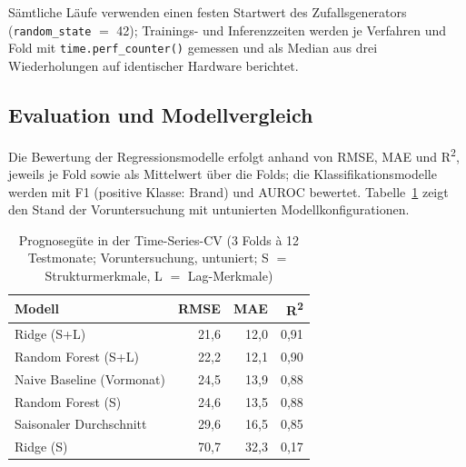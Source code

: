 Sämtliche Läufe verwenden einen festen Startwert des Zufallsgenerators
(\texttt{random\_state} $=$ 42); Trainings- und Inferenzzeiten werden je
Verfahren und Fold mit \texttt{time.perf\_counter()} gemessen und als Median
aus drei Wiederholungen auf identischer Hardware berichtet.

\subsection{Evaluation und Modellvergleich}
\label{sec:evaluation}

Die Bewertung der Regressionsmodelle erfolgt anhand von RMSE, MAE und
R\textsuperscript{2}, jeweils je Fold sowie als Mittelwert über die Folds;
die Klassifikationsmodelle werden mit F1 (positive Klasse: Brand) und AUROC
bewertet. Tabelle~\ref{tab:ergebnisse-regression} zeigt den Stand der
Voruntersuchung mit untunierten Modellkonfigurationen.

\begin{table}[htbp]
  \centering
  \caption{Prognosegüte in der Time-Series-CV (3 Folds à 12 Testmonate;
  Voruntersuchung, untuniert; S $=$ Strukturmerkmale, L $=$ Lag-Merkmale)}
  \label{tab:ergebnisse-regression}
  \begin{tabular}{lrrr}
    \hline
    \textbf{Modell} & \textbf{RMSE} & \textbf{MAE} &
    \textbf{R\textsuperscript{2}} \\
    \hline
    Ridge (S+L)             & 21{,}6 & 12{,}0 & 0{,}91 \\
    Random Forest (S+L)     & 22{,}2 & 12{,}1 & 0{,}90 \\
    Naive Baseline (Vormonat) & 24{,}5 & 13{,}9 & 0{,}88 \\
    Random Forest (S)       & 24{,}6 & 13{,}5 & 0{,}88 \\
    Saisonaler Durchschnitt & 29{,}6 & 16{,}5 & 0{,}85 \\
    Ridge (S)               & 70{,}7 & 32{,}3 & 0{,}17 \\
    \hline
  \end{tabular}
\end{table}

